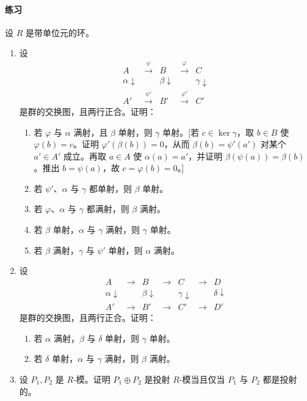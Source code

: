 \paragraph{练习}
设 $R$ 是带单位元的环。
\begin{enumerate}[label=\arabic*.]
	\item 设
	\[
	\begin{array}{ccccc}
		A & \xrightarrow{\psi} & B & \xrightarrow{\varphi} & C\\
		\alpha\downarrow & & \beta\downarrow & & \gamma\downarrow\\
		A'&\xrightarrow{\psi'}&B'&\xrightarrow{\varphi'}&C'
	\end{array}
	\]
	是群的交换图，且两行正合。证明：
	\begin{enumerate}[label=(\alph*)]
		\item 若 $\varphi$ 与 $\alpha$ 满射，且 $\beta$ 单射，则 $\gamma$ 单射。[若 $c\in\ker\gamma$，取 $b\in B$ 使 $\varphi(b)=c$。证明 $\varphi'(\beta(b))=0$，从而 $\beta(b)=\psi'(a')$ 对某个 $a'\in A'$ 成立。再取 $a\in A$ 使 $\alpha(a)=a'$，并证明 $\beta(\psi(a))=\beta(b)$。推出 $b=\psi(a)$，故 $c=\varphi(b)=0$。]
		\item 若 $\psi'$、$\alpha$ 与 $\gamma$ 都单射，则 $\beta$ 单射。
		\item 若 $\varphi$、$\alpha$ 与 $\gamma$ 都满射，则 $\beta$ 满射。
		\item 若 $\beta$ 单射，$\alpha$ 与 $\gamma$ 满射，则 $\gamma$ 单射。
		\item 若 $\beta$ 满射，$\gamma$ 与 $\psi'$ 单射，则 $\alpha$ 满射。
	\end{enumerate}
	\item 设
	\[
	\begin{array}{ccccccc}
		A&\longrightarrow&B&\longrightarrow&C&\longrightarrow&D\\
		\alpha\downarrow&&\beta\downarrow&&\gamma\downarrow&&\delta\downarrow\\
		A'&\longrightarrow&B'&\longrightarrow&C'&\longrightarrow&D'
	\end{array}
	\]
	是群的交换图，且两行正合。证明：
	\begin{enumerate}[label=(\alph*)]
		\item 若 $\alpha$ 满射，$\beta$ 与 $\delta$ 单射，则 $\gamma$ 单射。
		\item 若 $\delta$ 单射，$\alpha$ 与 $\gamma$ 满射，则 $\beta$ 满射。
	\end{enumerate}
	\item 设 $P_1,P_2$ 是 $R$-模。证明 $P_1\oplus P_2$ 是投射 $R$-模当且仅当 $P_1$ 与 $P_2$ 都是投射的。

\end{enumerate}
